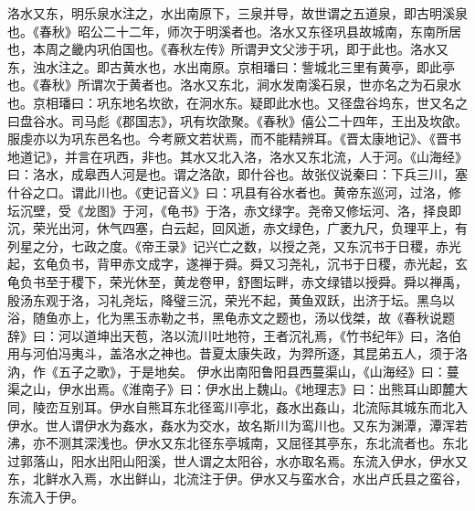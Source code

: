 \documentclass[12pt,UTF8]{ctexbook}
\begin{document}
洛水又东，明乐泉水注之，水出南原下，三泉并导，故世谓之五道泉，即古明溪泉也。《春秋》昭公二十二年，师次于明溪者也。洛水又东径巩县故城南，东南所居也，本周之畿内巩伯国也。《春秋左传》所谓尹文父涉于巩，即于此也。洛水又东，浊水注之。即古黄水也，水出南原。京相璠曰：訾城北三里有黄亭，即此亭也。《春秋》所谓次于黄者也。洛水又东北，涧水发南溪石泉，世亦名之为石泉水也。京相璠曰：巩东地名坎欲，在泂水东。疑即此水也。又径盘谷坞东，世又名之曰盘谷水。司马彪《郡国志》，巩有坎欿聚。《春秋》僖公二十四年，王出及坎欿。服虔亦以为巩东邑名也。今考厥文若状焉，而不能精辨耳。《晋太康地记》、《晋书地道记》，并言在巩西，非也。其水又北入洛，洛水又东北流，人于河。《山海经》曰：洛水，成皋西人河是也。谓之洛欿，即什谷也。故张仪说秦曰：下兵三川，塞什谷之口。谓此川也。《吏记音义》曰：巩县有谷水者也。黄帝东巡河，过洛，修坛沉壁，受《龙图》于河，《龟书》于洛，赤文绿字。尧帝又修坛河、洛，择良即沉，荣光出河，休气四塞，白云起，回风逝，赤文绿色，广袤九尺，负理平上，有列星之分，七政之度。《帝王录》记兴亡之数，以授之尧，又东沉书于日稷，赤光起，玄龟负书，背甲赤文成字，遂禅于舜。舜又习尧礼，沉书于日稷，赤光起，玄龟负书至于稷下，荣光休至，黄龙卷甲，舒图坛畔，赤文绿错以授舜。舜以禅禹，殷汤东观于洛，习礼尧坛，降璧三沉，荣光不起，黄鱼双跃，出济于坛。黑乌以浴，随鱼亦上，化为黑玉赤勒之书，黑龟赤文之题也，汤以伐桀，故《春秋说题辞》曰：河以道坤出天苞，洛以流川吐地符，王者沉礼焉，《竹书纪年》曰，洛伯用与河伯冯夷斗，盖洛水之神也。昔夏太康失政，为羿所逐，其昆弟五人，须于洛汭，作《五子之歌》，于是地矣。
伊水出南阳鲁阳县西蔓渠山，《山海经》曰：蔓渠之山，伊水出焉。《淮南子》曰：伊水出上魏山。《地理志》曰：出熊耳山即麓大同，陵峦互别耳。伊水自熊耳东北径鸾川亭北，姦水出姦山，北流际其城东而北入伊水。世人谓伊水为姦水，姦水为交水，故名斯川为鸾川也。又东为渊潭，潭浑若沸，亦不测其深浅也。伊水又东北径东亭城南，又屈径其亭东，东北流者也。东北过郭落山，阳水出阳山阳溪，世人谓之太阳谷，水亦取名焉。东流入伊水，伊水又东，北鲜水入焉，水出鲜山，北流注于伊。伊水又与蛮水合，水出卢氏县之蛮谷，东流入于伊。
\end{document}
